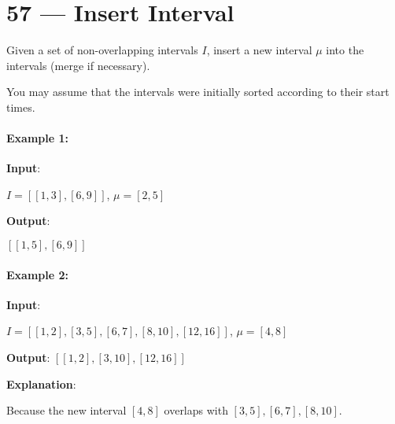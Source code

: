 \section{57 --- Insert Interval}
Given a set of non-overlapping intervals $I$, insert a new interval $\mu$ into the intervals (merge if necessary).
\par
You may assume that the intervals were initially sorted according to their start times.
\paragraph{Example 1:}
\begin{flushleft}
\textbf{Input}:
\par
$ I = [[1,3],[6,9]]$, $\mu = [2,5]$
\par
{}
\par
\textbf{Output}:
\par
$[[1,5],[6,9]]$
\end{flushleft}
\paragraph{Example 2:}
\begin{flushleft}
\textbf{Input}:
\par
$I= [[1,2],[3,5],[6,7],[8,10],[12,16]]$, $\mu= [4,8]$
\par
\textbf{Output}: $[[1,2],[3,10],[12,16]]$
\par
\textbf{Explanation}:
\par
Because the new interval $[4,8]$ overlaps with $[3,5],[6,7],[8,10]$.
\end{flushleft} 

